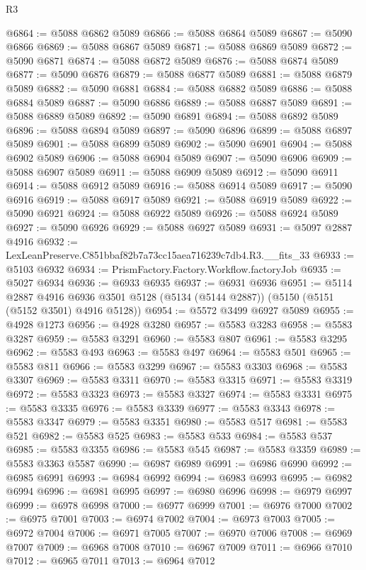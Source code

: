 \begin{lexlean}{R3}
\begin{coremodule}
@6864 := @5088 @6862 @5089
@6866 := @5088 @6864 @5089
@6867 := @5090 @6866
@6869 := @5088 @6867 @5089
@6871 := @5088 @6869 @5089
@6872 := @5090 @6871
@6874 := @5088 @6872 @5089
@6876 := @5088 @6874 @5089
@6877 := @5090 @6876
@6879 := @5088 @6877 @5089
@6881 := @5088 @6879 @5089
@6882 := @5090 @6881
@6884 := @5088 @6882 @5089
@6886 := @5088 @6884 @5089
@6887 := @5090 @6886
@6889 := @5088 @6887 @5089
@6891 := @5088 @6889 @5089
@6892 := @5090 @6891
@6894 := @5088 @6892 @5089
@6896 := @5088 @6894 @5089
@6897 := @5090 @6896
@6899 := @5088 @6897 @5089
@6901 := @5088 @6899 @5089
@6902 := @5090 @6901
@6904 := @5088 @6902 @5089
@6906 := @5088 @6904 @5089
@6907 := @5090 @6906
@6909 := @5088 @6907 @5089
@6911 := @5088 @6909 @5089
@6912 := @5090 @6911
@6914 := @5088 @6912 @5089
@6916 := @5088 @6914 @5089
@6917 := @5090 @6916
@6919 := @5088 @6917 @5089
@6921 := @5088 @6919 @5089
@6922 := @5090 @6921
@6924 := @5088 @6922 @5089
@6926 := @5088 @6924 @5089
@6927 := @5090 @6926
@6929 := @5088 @6927 @5089
@6931 := @5097 @2887 @4916
@6932 := LexLeanPreserve.C851bbaf82b7a73cc15aea716239c7db4.R3.__fits_33
@6933 := @5103 @6932
@6934 := PrismFactory.Factory.Workflow.factoryJob
@6935 := @5027 @6934
@6936 := @6933 @6935
@6937 := @6931 @6936
@6951 := @5114
    @2887
    @4916
    @6936
    @3501
    @5128
    (@5134 (@5144 @2887))
    (@5150 (@5151 (@5152 @3501) @4916 @5128))
@6954 := @5572 @3499 @6927 @5089
@6955 := @4928 @1273
@6956 := @4928 @3280
@6957 := @5583 @3283
@6958 := @5583 @3287
@6959 := @5583 @3291
@6960 := @5583 @807
@6961 := @5583 @3295
@6962 := @5583 @493
@6963 := @5583 @497
@6964 := @5583 @501
@6965 := @5583 @811
@6966 := @5583 @3299
@6967 := @5583 @3303
@6968 := @5583 @3307
@6969 := @5583 @3311
@6970 := @5583 @3315
@6971 := @5583 @3319
@6972 := @5583 @3323
@6973 := @5583 @3327
@6974 := @5583 @3331
@6975 := @5583 @3335
@6976 := @5583 @3339
@6977 := @5583 @3343
@6978 := @5583 @3347
@6979 := @5583 @3351
@6980 := @5583 @517
@6981 := @5583 @521
@6982 := @5583 @525
@6983 := @5583 @533
@6984 := @5583 @537
@6985 := @5583 @3355
@6986 := @5583 @545
@6987 := @5583 @3359
@6989 := @5583 @3363 @5587
@6990 := @6987 @6989
@6991 := @6986 @6990
@6992 := @6985 @6991
@6993 := @6984 @6992
@6994 := @6983 @6993
@6995 := @6982 @6994
@6996 := @6981 @6995
@6997 := @6980 @6996
@6998 := @6979 @6997
@6999 := @6978 @6998
@7000 := @6977 @6999
@7001 := @6976 @7000
@7002 := @6975 @7001
@7003 := @6974 @7002
@7004 := @6973 @7003
@7005 := @6972 @7004
@7006 := @6971 @7005
@7007 := @6970 @7006
@7008 := @6969 @7007
@7009 := @6968 @7008
@7010 := @6967 @7009
@7011 := @6966 @7010
@7012 := @6965 @7011
@7013 := @6964 @7012

\end{coremodule}
\end{lexlean}
